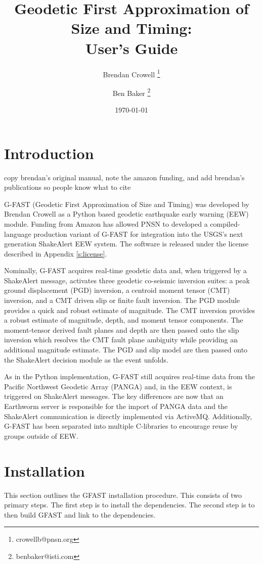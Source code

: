 \documentclass[12pt]{article}
\title{
Geodetic First Approximation of Size and Timing: \\ User's Guide
}
\author[1]{Brendan Crowell \thanks{crowellb@pnsn.org}}
\author[2]{Ben Baker \thanks{benbaker@isti.com}}
\affil[1]{Pacific Northwest Seismic Network}
\affil[2]{Instrumental Software Technologies, Inc.}
\date{\today}
\begin{document}
\maketitle
\tableofcontents

\clearpage
\section{Introduction}
copy brendan's original manual, note the amazon funding, and add brendan's publications
so people know what to cite  

G-FAST (Geodetic First Approximation of Size and Timing) was developed by Brendan Crowell
as a Python based geodetic earthquake early warning (EEW) module.  Funding from Amazon has
allowed PNSN to developed a compiled-language production variant of G-FAST for integration 
into the USGS's next generation ShakeAlert EEW system.  The software is released under the 
license described in Appendix \ref{s:license}.

Nominally, G-FAST acquires real-time geodetic data and, when triggered by a ShakeAlert
message, activates three geodetic co-seismic inversion suites: a peak ground displacement 
(PGD) inversion, a centroid moment tensor (CMT) inversion, and a CMT driven slip or finite fault
inversion.  The PGD module provides a quick and robust estimate of magnitude.  
The CMT inversion provides a robust estimate of magnitude, depth, and moment tensor
components.  The moment-tensor derived fault planes and depth are then passed onto the
slip inversion which resolves the CMT fault plane ambiguity while providing an 
additional magnitude estimate.  The PGD and slip model are then passed onto the
ShakeAlert decision module as the event unfolds.  

As in the Python implementation, G-FAST still acquires real-time data from the Pacific
Northwest Geodetic Array (PANGA) and, in the EEW context, is triggered on ShakeAlert
messages.  The key differences are now that an Earthworm server is responsible for the
import of PANGA data and the ShakeAlert communication is directly implemented via  
ActiveMQ.  Additionally, G-FAST has been separated into multiple C-libraries to encourage
reuse by groups outside of EEW.  



 

\clearpage
\section{Installation}
This section outlines the GFAST installation procedure.  This consists of two primary steps.
The first step is to install the dependencies.  The second step is to then build GFAST and
link to the dependencies.    
\end{document}
